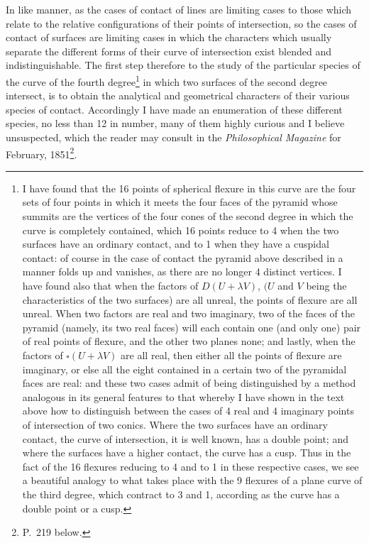 \documentclass[11pt]{article}
\begin{document}
{{In like manner, as the cases of contact of lines are limiting cases to those which relate to the relative configurations of their points of intersection, so the cases of contact of surfaces are limiting cases in which the characters which usually separate the different forms of their curve of intersection exist blended and indistinguishable. The first step therefore to the study of the particular species of the curve of the fourth degree\footnote{I have found that the 16 points of spherical flexure in this curve are the four sets of four points in which it meets the four faces of the pyramid whose summits are the vertices of the four cones of the second degree in which the curve is completely contained, which 16 points reduce to 4 when the two surfaces have an ordinary contact, and to 1 when they have a cuspidal contact: of course in the case of contact the pyramid above described in a manner folds up and vanishes, as there are no longer 4 distinct vertices. I have found also that when the factors of $D(U+\lambda V)$, $(U$ and $V$ being the characteristics of the two surfaces) are all unreal, the points of flexure are all unreal. When two factors are real and two imaginary, two of the faces of the pyramid (namely, its two real faces) will each contain one (and only one) pair of real points of flexure, and the other two planes none; and lastly, when the factors of $\square(U+\lambda V)$ are all real, then either all the points of flexure are imaginary, or else all the eight contained in a certain two of the pyramidal faces are real: and these two cases admit of being distinguished by a method analogous in its general features to that whereby I have shown in the text above how to distinguish between the cases of 4 real and 4 imaginary points of intersection of two conics. Where the two surfaces have an ordinary contact, the curve of intersection, it is well known, has a double point; and where the surfaces have a higher contact, the curve has a cusp. Thus in the fact of the 16 flexures reducing to 4 and to 1 in these respective cases, we see a beautiful analogy to what takes place with the 9 flexures of a plane curve of the third degree, which contract to 3 and 1, according as the curve has a double point or a cusp.} in which two surfaces of the second degree intersect, is to obtain the analytical and geometrical characters of their various species of contact. Accordingly I have made an enumeration of these different species, no less than 12 in number, many of them highly curious and I believe unsuspected, which the reader may consult in the \emph{Philosophical Magazine} for February, 1851\footnote{P.~219 below.}.

}}
\end{document}
